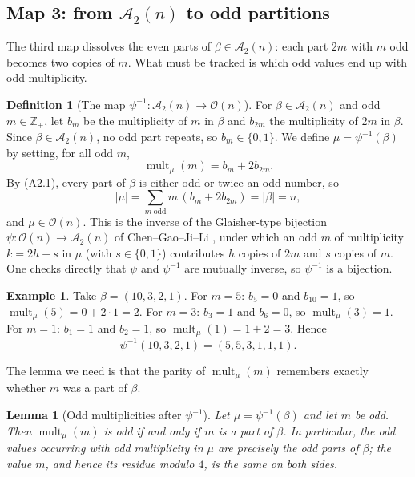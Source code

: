 \documentclass[11pt]{amsart}
\newtheorem{lemma}[theorem]{Lemma}
\theoremstyle{definition}
\newtheorem{definition}[theorem]{Definition}
\newtheorem{example}[theorem]{Example}
\theoremstyle{remark}
\newcommand{\Oparts}{\mathcal O}
\newcommand{\Atwo}{\mathcal A_2}
\newcommand{\mult}{\operatorname{mult}}
\begin{document}
\subsection{Map 3: from \texorpdfstring{$\Atwo(n)$}{A2(n)} to odd partitions}\label{sec:map3}

The third map dissolves the even parts of $\beta\in\Atwo(n)$: each part $2m$ with $m$ odd becomes two copies of $m$. What must be tracked is which odd values end up with odd multiplicity.

\begin{definition}[The map \(\psi^{-1}:\Atwo(n)\to\Oparts(n)\)]\label{def:psiinv}
For $\beta\in\Atwo(n)$ and odd $m\in\mathbb{Z}_+$, let $b_m$ be the multiplicity of $m$ in $\beta$ and $b_{2m}$ the multiplicity of $2m$ in $\beta$. Since $\beta \in \Atwo(n)$, no odd part repeats, so $b_m\in\{0,1\}$. We define $\mu=\psi^{-1}(\beta)$ by setting, for all odd $m$, $$\mult_\mu(m)=b_m+2b_{2m}.$$
By \textup{(A2.1)}, every part of $\beta$ is either odd or twice an odd number, so
\[
   |\mu|=\sum_{m\ \mathrm{odd}} m\,(b_m+2b_{2m})=|\beta|=n,
\]
and $\mu\in\Oparts(n)$.
This is the inverse of the Glaisher-type bijection $\psi:\Oparts(n)\to\Atwo(n)$ of Chen--Gao--Ji--Li \cite[Lemma 2.3]{CGJL}, under which an odd $m$ of multiplicity $k=2h+s$ in $\mu$ (with $s\in\{0,1\}$) contributes $h$ copies of $2m$ and $s$ copies of $m$. One checks directly that \(\psi\) and \(\psi^{-1}\) are mutually inverse, so \(\psi^{-1}\) is a bijection.
\end{definition}

\begin{example}\label{ex:psiinv}
Take $\beta = (10,3,2,1)$. For $m=5$: $b_5=0$ and $b_{10}=1$, so $\mult_\mu(5)=0+2\cdot1=2$.
For $m=3$: $b_3=1$ and $b_6=0$, so $\mult_\mu(3)=1$.
For $m=1$: $b_1=1$ and $b_2=1$, so $\mult_\mu(1)=1+2=3$.
Hence $$\psi^{-1}(10,3,2,1)=(5,5,3,1,1,1).$$
\end{example}

The lemma we need is that the parity of $\mult_\mu(m)$ remembers exactly whether $m$ was a part of $\beta$.

\begin{lemma}[Odd multiplicities after \(\psi^{-1}\)]\label{lem:psiinv}
Let $\mu=\psi^{-1}(\beta)$ and let $m$ be odd. Then $\mult_\mu(m)$ is odd if and only if $m$ is a part of $\beta$. In particular, the odd values occurring with odd multiplicity in $\mu$ are precisely the odd parts of $\beta$; the value $m$, and hence its residue modulo $4$, is the same on both sides.
\end{lemma}
\end{document}
